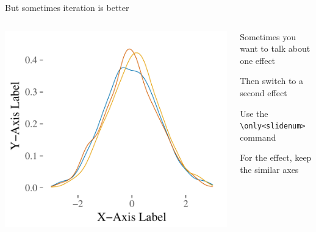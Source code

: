 \documentclass[notes,11pt, aspectratio=169]{beamer}
\newenvironment{wideitemize}{\itemize\addtolength{\itemsep}{10pt}}{\enditemize}
\begin{document}
\begin{frame}{But sometimes iteration is better}
\begin{columns}[T]
\begin{column}{.58\textwidth}
{{      \includegraphics{figure3_overlay.pdf}
    }
  }
\end{column}
\hfill
\begin{column}{.4\textwidth}
  \begin{wideitemize}
  \item<1-> Sometimes you want to talk about one effect
  \item<2-> Then switch to a second effect 
  \item<3-> Use the \texttt{\textbackslash only<slidenum>} command
  \item<3-> For the effect, keep the similar axes
  \end{wideitemize}
  \end{column}
\end{columns}
\end{frame}
\end{document}
